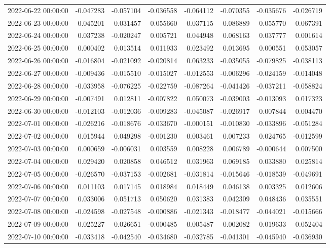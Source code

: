 \begin{tabular}{lrrrrrrr}
2022-06-22 00:00:00 & -0.047283 & -0.057104 & -0.036558 & -0.064112 & -0.070355 & -0.035676 & -0.026719 \\
2022-06-23 00:00:00 & 0.045201 & 0.031457 & 0.055660 & 0.037115 & 0.086889 & 0.055770 & 0.067391 \\
2022-06-24 00:00:00 & 0.037238 & -0.020247 & 0.005721 & 0.044948 & 0.068163 & 0.037777 & 0.001614 \\
2022-06-25 00:00:00 & 0.000402 & 0.013514 & 0.011933 & 0.023492 & 0.013695 & 0.000551 & 0.053057 \\
2022-06-26 00:00:00 & -0.016804 & -0.021092 & -0.020814 & 0.063233 & -0.035055 & -0.079825 & -0.038113 \\
2022-06-27 00:00:00 & -0.009436 & -0.015510 & -0.015027 & -0.012553 & -0.006296 & -0.024159 & -0.014048 \\
2022-06-28 00:00:00 & -0.033958 & -0.076225 & -0.022759 & -0.087264 & -0.041426 & -0.037211 & -0.058824 \\
2022-06-29 00:00:00 & -0.007491 & 0.012811 & -0.007822 & 0.050073 & -0.039003 & -0.013093 & 0.017323 \\
2022-06-30 00:00:00 & -0.012103 & -0.012036 & -0.009283 & -0.045087 & -0.026917 & 0.007844 & 0.004470 \\
2022-07-01 00:00:00 & -0.026216 & -0.018676 & -0.033670 & -0.000151 & -0.010830 & -0.033896 & -0.051284 \\
2022-07-02 00:00:00 & 0.015944 & 0.049298 & -0.001230 & 0.003461 & 0.007233 & 0.024765 & -0.012599 \\
2022-07-03 00:00:00 & 0.000659 & -0.006031 & 0.003559 & 0.008228 & 0.006789 & -0.000644 & 0.007500 \\
2022-07-04 00:00:00 & 0.029420 & 0.020858 & 0.046512 & 0.031963 & 0.069185 & 0.033880 & 0.025814 \\
2022-07-05 00:00:00 & -0.026570 & -0.037153 & -0.002681 & -0.031814 & -0.015646 & -0.018539 & -0.049691 \\
2022-07-06 00:00:00 & 0.011103 & 0.017145 & 0.018984 & 0.018449 & 0.046138 & 0.003325 & 0.012606 \\
2022-07-07 00:00:00 & 0.033006 & 0.051713 & 0.050620 & 0.031383 & 0.042309 & 0.048436 & 0.035551 \\
2022-07-08 00:00:00 & -0.024598 & -0.027548 & -0.000886 & -0.021343 & -0.018477 & -0.044021 & -0.015666 \\
2022-07-09 00:00:00 & 0.025227 & 0.026651 & -0.000485 & 0.005487 & 0.002082 & 0.019633 & 0.052404 \\
2022-07-10 00:00:00 & -0.033418 & -0.042540 & -0.034680 & -0.032785 & -0.041301 & -0.045940 & -0.036930 \\

\end{tabular}
